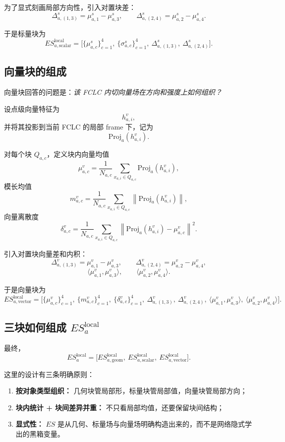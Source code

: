 \documentclass[12pt,a4paper]{ctexart}
\begin{document}
为了显式刻画局部方向性，引入对置块差：
\[
\Delta_{a,(1,3)}^{s}=\mu_{a,1}^{s}-\mu_{a,3}^{s},
\qquad
\Delta_{a,(2,4)}^{s}=\mu_{a,2}^{s}-\mu_{a,4}^{s}.
\]

于是标量块为
\[
ES_{a,\mathrm{scalar}}^{\mathrm{local}}
=
\Big[
\{\mu_{a,c}^{s}\}_{c=1}^{4},\
\{\sigma_{a,c}^{s}\}_{c=1}^{4},\
\Delta_{a,(1,3)}^{s},\
\Delta_{a,(2,4)}^{s}
\Big].
\]

\subsection{向量块的组成}

向量块回答的问题是：\emph{该 FCLC 内切向量场在方向和强度上如何组织？}

设点级向量特征为
\[
h_{a,i}^{v},
\]
并将其投影到当前 FCLC 的局部 frame 下，记为
\[
\mathrm{Proj}_a(h_{a,i}^{v}).
\]

对每个块 \(Q_{a,c}\)，定义块内向量均值
\[
\mu_{a,c}^{v}
=
\frac{1}{N_{a,c}}
\sum_{x_{a,i}\in Q_{a,c}}
\mathrm{Proj}_a(h_{a,i}^{v}),
\]
模长均值
\[
m_{a,c}^{v}
=
\frac{1}{N_{a,c}}
\sum_{x_{a,i}\in Q_{a,c}}
\left\|
\mathrm{Proj}_a(h_{a,i}^{v})
\right\|,
\]
向量离散度
\[
\delta_{a,c}^{v}
=
\frac{1}{N_{a,c}}
\sum_{x_{a,i}\in Q_{a,c}}
\left\|
\mathrm{Proj}_a(h_{a,i}^{v})-\mu_{a,c}^{v}
\right\|^2.
\]

引入对置块向量差和内积：
\[
\Delta_{a,(1,3)}^{v}=\mu_{a,1}^{v}-\mu_{a,3}^{v},
\qquad
\Delta_{a,(2,4)}^{v}=\mu_{a,2}^{v}-\mu_{a,4}^{v},
\]
\[
\langle \mu_{a,1}^{v},\mu_{a,3}^{v}\rangle,
\qquad
\langle \mu_{a,2}^{v},\mu_{a,4}^{v}\rangle.
\]

于是向量块为
\[
ES_{a,\mathrm{vector}}^{\mathrm{local}}
=
\Big[
\{\mu_{a,c}^{v}\}_{c=1}^{4},\
\{m_{a,c}^{v}\}_{c=1}^{4},\
\{\delta_{a,c}^{v}\}_{c=1}^{4},\
\Delta_{a,(1,3)}^{v},\
\Delta_{a,(2,4)}^{v},\
\langle \mu_{a,1}^{v},\mu_{a,3}^{v}\rangle,\
\langle \mu_{a,2}^{v},\mu_{a,4}^{v}\rangle
\Big].
\]

\subsection{三块如何组成 \(ES_a^{\mathrm{local}}\)}

最终，
\[
ES_a^{\mathrm{local}}
=
\Big[
ES_{a,\mathrm{geom}}^{\mathrm{local}},\
ES_{a,\mathrm{scalar}}^{\mathrm{local}},\
ES_{a,\mathrm{vector}}^{\mathrm{local}}
\Big].
\]

这里的设计有三条明确原则：

\begin{enumerate}[leftmargin=2em]
    \item \textbf{按对象类型组织：} 几何块管局部形，标量块管局部值，向量块管局部方向；
    \item \textbf{块内统计 + 块间差异并重：} 不只看局部均值，还要保留块间结构；
    \item \textbf{显式性：} \(ES\) 是从几何、标量场与向量场明确构造出来的，而不是网络隐式学出的黑箱变量。
\end{enumerate}
\end{document}
